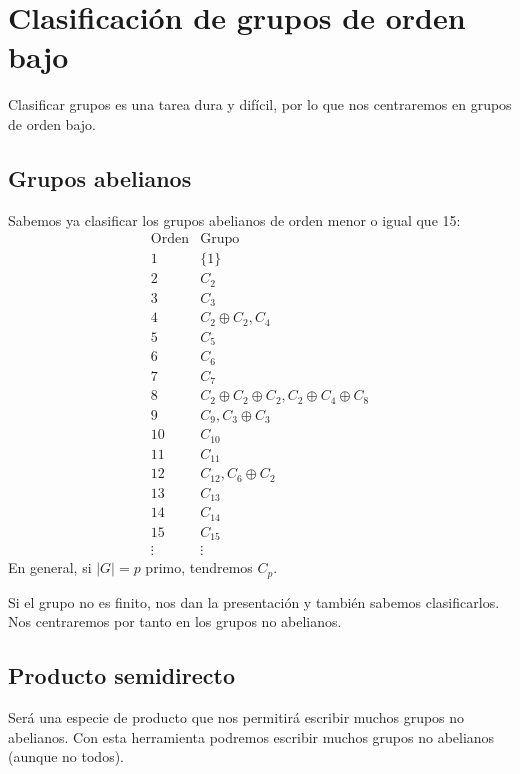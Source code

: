 \chapter{Clasificación de grupos de orden bajo}
\noindent
Clasificar grupos es una tarea dura y difícil, por lo que nos centraremos en grupos de orden bajo.

\section{Grupos abelianos}
Sabemos ya clasificar los grupos abelianos de orden menor o igual que 15:
\begin{equation*}
    \begin{array}{c|c}
        \text{Orden}  & \text{Grupo} \\
        \hline
        1 & \{1\} \\
        2 & C_2 \\
        3 & C_3 \\
        4 & C_2\oplus C_2, C_4 \\
        5 & C_5 \\
        6 & C_6 \\
        7 & C_7 \\
        8 & C_2\oplus C_2 \oplus C_2, C_2\oplus C_4 \oplus C_8 \\
        9 & C_9, C_3\oplus C_3 \\
        10 & C_{10} \\
        11 & C_{11} \\
        12 & C_{12}, C_6\oplus C_2 \\
        13 & C_{13} \\
        14 & C_{14} \\
        15 & C_{15} \\
        \vdots & \vdots 
    \end{array}
\end{equation*}
En general, si $|G| = p$ primo, tendremos $C_p$.

Si el grupo no es finito, nos dan la presentación y también sabemos clasificarlos. Nos centraremos por tanto en los grupos no abelianos.

\section{Producto semidirecto}
\noindent
Será una especie de producto que nos permitirá escribir muchos grupos no abelianos. Con esta herramienta podremos escribir muchos grupos no abelianos (aunque no todos).

